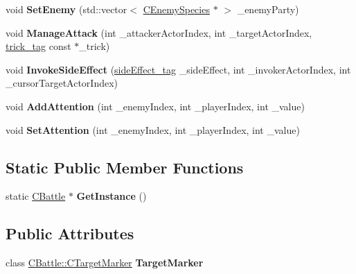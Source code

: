 \begin{DoxyCompactItemize}
\item 
void {\bfseries Set\+Enemy} (std\+::vector$<$ \hyperlink{class_c_enemy_species}{C\+Enemy\+Species} $\ast$ $>$ \+\_\+enemy\+Party)\hypertarget{class_c_battle_a671882f3bbfe8b6a34a3a65160447894}{}\label{class_c_battle_a671882f3bbfe8b6a34a3a65160447894}

\item 
void {\bfseries Manage\+Attack} (int \+\_\+attacker\+Actor\+Index, int \+\_\+target\+Actor\+Index, \hyperlink{structtrick__tag}{trick\+\_\+tag} const $\ast$\+\_\+trick)\hypertarget{class_c_battle_a4c5aafcdc5093d314d73c78196082e39}{}\label{class_c_battle_a4c5aafcdc5093d314d73c78196082e39}

\item 
void {\bfseries Invoke\+Side\+Effect} (\hyperlink{structside_effect__tag}{side\+Effect\+\_\+tag} \+\_\+side\+Effect, int \+\_\+invoker\+Actor\+Index, int \+\_\+cursor\+Target\+Actor\+Index)\hypertarget{class_c_battle_a281ea23b83e29651bc5d8ffeee52f795}{}\label{class_c_battle_a281ea23b83e29651bc5d8ffeee52f795}

\item 
void {\bfseries Add\+Attention} (int \+\_\+enemy\+Index, int \+\_\+player\+Index, int \+\_\+value)\hypertarget{class_c_battle_a7960e2044172396ea8bf5674ebee61a8}{}\label{class_c_battle_a7960e2044172396ea8bf5674ebee61a8}

\item 
void {\bfseries Set\+Attention} (int \+\_\+enemy\+Index, int \+\_\+player\+Index, int \+\_\+value)\hypertarget{class_c_battle_adb7548ecf000b3ce3b0f8cd8c6b5db83}{}\label{class_c_battle_adb7548ecf000b3ce3b0f8cd8c6b5db83}

\end{DoxyCompactItemize}
\subsection*{Static Public Member Functions}
\begin{DoxyCompactItemize}
\item 
static \hyperlink{class_c_battle}{C\+Battle} $\ast$ {\bfseries Get\+Instance} ()\hypertarget{class_c_battle_a8e2e28c3ccfef842dc884e033b49fad6}{}\label{class_c_battle_a8e2e28c3ccfef842dc884e033b49fad6}

\end{DoxyCompactItemize}
\subsection*{Public Attributes}
\begin{DoxyCompactItemize}
\item 
class \hyperlink{class_c_battle_1_1_c_target_marker}{C\+Battle\+::\+C\+Target\+Marker} {\bfseries Target\+Marker}\hypertarget{class_c_battle_a834011fdbcaf9ce06c2a0aa09142daf7}{}\label{class_c_battle_a834011fdbcaf9ce06c2a0aa09142daf7}

\end{DoxyCompactItemize}
